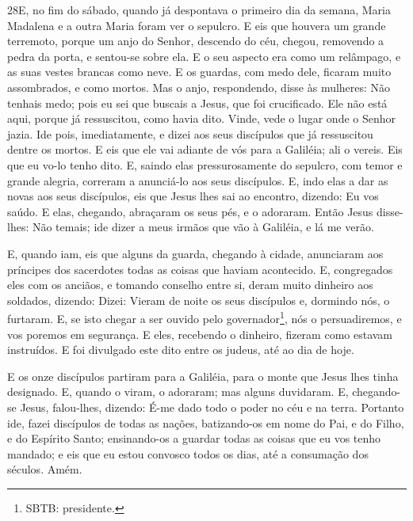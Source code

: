 \medskip

\lettrine{28} E, no fim do sábado, quando já despontava o
primeiro dia da semana, Maria Madalena e a outra Maria foram ver o
sepulcro. E eis que houvera um grande terremoto, porque um anjo
do Senhor, descendo do céu, chegou, removendo a pedra da porta, e
sentou-se sobre ela. E o seu aspecto era como um relâmpago, e as
suas vestes brancas como neve. E os guardas, com medo dele,
ficaram muito assombrados, e como mortos. Mas o anjo,
respondendo, disse às mulheres: Não tenhais medo; pois eu sei que
buscais a Jesus, que foi crucificado. Ele não está aqui, porque
já ressuscitou, como havia dito. Vinde, vede o lugar onde o Senhor
jazia. Ide pois, imediatamente, e dizei aos seus discípulos que
já ressuscitou dentre os mortos. E eis que ele vai adiante de vós
para a Galiléia; ali o vereis. Eis que eu vo-lo tenho dito. E,
saindo elas pressurosamente do sepulcro, com temor e grande alegria,
correram a anunciá-lo aos seus discípulos. E, indo elas a dar as
novas aos seus discípulos, eis que Jesus lhes sai ao encontro,
dizendo: Eu vos saúdo. E elas, chegando, abraçaram os seus pés, e o
adoraram. Então Jesus disse-lhes: Não temais; ide dizer a
meus irmãos que vão à Galiléia, e lá me verão.

E, quando iam, eis que alguns da guarda, chegando à cidade,
anunciaram aos príncipes dos sacerdotes todas as coisas que haviam
acontecido. E, congregados eles com os anciãos, e tomando
conselho entre si, deram muito dinheiro aos soldados,
dizendo: Dizei: Vieram de noite os seus discípulos e,
dormindo nós, o furtaram. E, se isto chegar a ser ouvido pelo
governador\footnote{SBTB: presidente.}, nós o persuadiremos, e vos
poremos em segurança. E eles, recebendo o dinheiro, fizeram
como estavam instruídos. E foi divulgado este dito entre os judeus,
até ao dia de hoje.

E os onze discípulos partiram para a Galiléia, para o monte que
Jesus lhes tinha designado. E, quando o viram, o adoraram;
mas alguns duvidaram. E, chegando-se Jesus, falou-lhes,
dizendo:  É-me dado todo o poder no céu e na terra. Portanto
ide, fazei discípulos de todas as nações, batizando-os em nome do
Pai, e do Filho, e do Espírito Santo; ensinando-os a guardar
todas as coisas que eu vos tenho mandado; e eis que eu estou
convosco todos os dias, até a consumação dos séculos. Amém.



